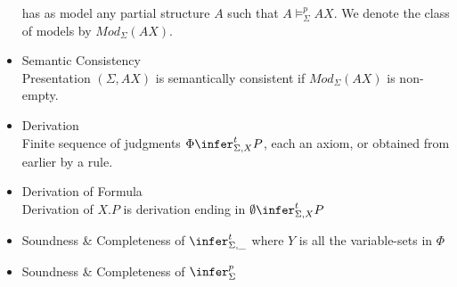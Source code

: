 \begin{itemize}
    has as model any partial structure $A$ such that $A \models^p_\Sigma AX$.
    We denote the class of models by $Mod_\Sigma(AX)$.
  \item Semantic Consistency
    \\ Presentation $(\Sigma,AX)$ is semantically consistent if $Mod_\Sigma(AX)$ is non-empty.
  \item Derivation
    \\ Finite sequence of judgments $\Phi \infer^t_{\Sigma,X} P$,
       each an axiom, or obtained from earlier by a rule.
  \item Derivation of Formula
    \\ Derivation of $X.P$ is derivation ending in $\emptyset \infer^t_{\Sigma,X} P$
  \item Soundness \& Completeness of $\infer^t_{\Sigma,\_}$
    where $Y$ is all the variable-sets in $\Phi$
  \item Soundness \& Completeness of $\infer^p_\Sigma$
\end{itemize}


